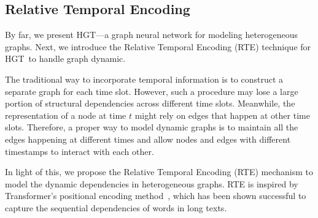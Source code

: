 \documentclass[sigconf]{acmart}
\theoremstyle{definition}
\newcommand{\short}{HGT}
\begin{document}
\subsection{Relative Temporal Encoding}
By far, we present \short---a graph neural network for modeling heterogeneous graphs. 
Next, we introduce the Relative Temporal Encoding (RTE) technique for \short\ to handle graph dynamic. 


The traditional way to incorporate temporal information is to construct a separate graph for each time slot. 
However, such a procedure may lose a large portion of structural dependencies across different time slots. 
Meanwhile, the representation of a node at time $t$ might rely on edges that happen at other time slots. 
Therefore, a proper way to model dynamic graphs is to maintain all the edges happening at different times and allow nodes and edges with different timestamps to interact with each other.

In light of this, we propose the Relative Temporal Encoding (RTE) mechanism to model the dynamic dependencies in heterogeneous graphs. 
RTE is inspired by Transformer's positional encoding method~\cite{DBLP:conf/nips/VaswaniSPUJGKP17, DBLP:conf/naacl/ShawUV18}, which has been shown successful to capture the sequential dependencies of words in long texts. 
\end{document}
